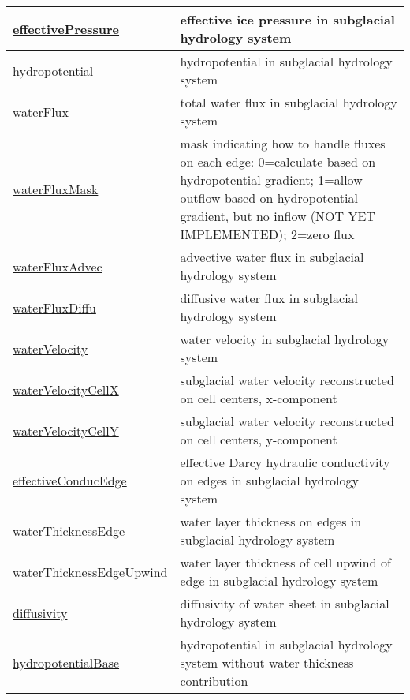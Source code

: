{\begin{center}
\begin{longtable}{| p{2.0in} | p{4.0in} |}
    \hline
    \hyperref[subsec:var_sec_hydro_effectivePressure]{effectivePressure} & effective ice pressure in subglacial hydrology system \\
    \hline
    \hyperref[subsec:var_sec_hydro_hydropotential]{hydropotential} & hydropotential in subglacial hydrology system \\
    \hline
    \hyperref[subsec:var_sec_hydro_waterFlux]{waterFlux} & total water flux in subglacial hydrology system \\
    \hline
    \hyperref[subsec:var_sec_hydro_waterFluxMask]{waterFluxMask} & mask indicating how to handle fluxes on each edge: 0=calculate based on hydropotential gradient; 1=allow outflow based on hydropotential gradient, but no inflow (NOT YET IMPLEMENTED); 2=zero flux \\
    \hline
    \hyperref[subsec:var_sec_hydro_waterFluxAdvec]{waterFluxAdvec} & advective water flux in subglacial hydrology system \\
    \hline
    \hyperref[subsec:var_sec_hydro_waterFluxDiffu]{waterFluxDiffu} & diffusive water flux in subglacial hydrology system \\
    \hline
    \hyperref[subsec:var_sec_hydro_waterVelocity]{waterVelocity} & water velocity in subglacial hydrology system \\
    \hline
    \hyperref[subsec:var_sec_hydro_waterVelocityCellX]{waterVelocityCellX} & subglacial water velocity reconstructed on cell centers, x-component \\
    \hline
    \hyperref[subsec:var_sec_hydro_waterVelocityCellY]{waterVelocityCellY} & subglacial water velocity reconstructed on cell centers, y-component \\
    \hline
    \hyperref[subsec:var_sec_hydro_effectiveConducEdge]{effectiveConducEdge} & effective Darcy hydraulic conductivity on edges in subglacial hydrology system \\
    \hline
    \hyperref[subsec:var_sec_hydro_waterThicknessEdge]{waterThicknessEdge} & water layer thickness on edges in subglacial hydrology system \\
    \hline
    \hyperref[subsec:var_sec_hydro_waterThicknessEdgeUpwind]{waterThicknessEdgeUpwind} & water layer thickness of cell upwind of edge in subglacial hydrology system \\
    \hline
    \hyperref[subsec:var_sec_hydro_diffusivity]{diffusivity} & diffusivity of water sheet in subglacial hydrology system \\
    \hline
    \hyperref[subsec:var_sec_hydro_hydropotentialBase]{hydropotentialBase} & hydropotential in subglacial hydrology system without water thickness contribution \\

\end{longtable}
\end{center}}
